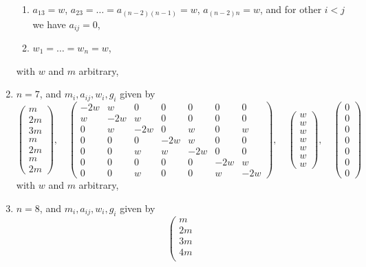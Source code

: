 \begin{lemma}
\begin{enumerate}
\begin{enumerate}
\item $a_{13} = w$, $a_{23} = \ldots = a_{(n - 2) (n - 1)} = w$,
$a_{(n - 2) n} = w$, and for other $i < j$ we have $a_{ij} = 0$,
\item $w_1 = \ldots = w_n = w$,
\end{enumerate}
with $w$ and $m$ arbitrary,
\item
\label{item-E6-completed}
$n = 7$, and $m_i, a_{ij}, w_i, g_i$ given by
$$
\left(
\begin{matrix}
m \\
2m \\
3m \\
m \\
2m \\
m \\
2m
\end{matrix}
\right),
\quad
\left(
\begin{matrix}
-2w & w & 0 & 0 & 0 & 0 & 0 \\
w & -2w & w & 0 & 0 & 0 & 0 \\
0 & w & -2w & 0 & w & 0 & w \\
0 & 0 & 0 & -2w & w & 0 & 0 \\
0 & 0 & w & w & -2w & 0 & 0 \\
0 & 0 & 0 & 0 & 0 & -2w & w \\
0 & 0 & w & 0 & 0 & w & -2w
\end{matrix}
\right),
\quad
\left(
\begin{matrix}
w \\
w \\
w \\
w \\
w \\
w \\
w
\end{matrix}
\right),
\quad
\left(
\begin{matrix}
0 \\
0 \\
0 \\
0 \\
0 \\
0 \\
0
\end{matrix}
\right)
$$
with $w$ and $m$ arbitrary,
\item
\label{item-E7-completed}
$n = 8$, and $m_i, a_{ij}, w_i, g_i$ given by
$$
\left(
\begin{matrix}
m \\
2m \\
3m \\
4m \\

\end{matrix}$$
\end{enumerate}
\end{lemma}
